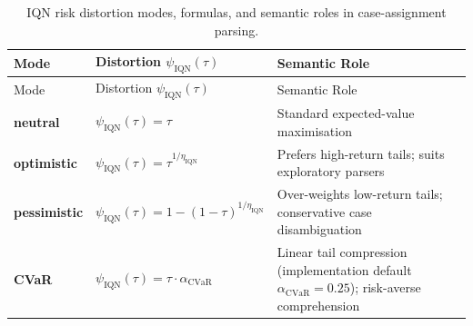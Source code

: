 \documentclass[
]{article}
\begin{document}
\begin{longtable}[]{@{}
  >{\raggedright\arraybackslash}p{}
  >{\raggedright\arraybackslash}p{}
  >{\raggedright\arraybackslash}p{}@{}}
\caption{IQN risk distortion modes, formulas, and semantic roles in
case-assignment parsing.}\label{tbl:iqn-modes}\tabularnewline
\toprule\noalign{}
\begin{minipage}[b]{\linewidth}\raggedright
Mode
\end{minipage} & \begin{minipage}[b]{\linewidth}\raggedright
Distortion \(\psi_{\mathrm{IQN}}(\tau)\)
\end{minipage} & \begin{minipage}[b]{\linewidth}\raggedright
Semantic Role
\end{minipage} \\
\midrule\noalign{}
\endfirsthead
\toprule\noalign{}
\begin{minipage}[b]{\linewidth}\raggedright
Mode
\end{minipage} & \begin{minipage}[b]{\linewidth}\raggedright
Distortion \(\psi_{\mathrm{IQN}}(\tau)\)
\end{minipage} & \begin{minipage}[b]{\linewidth}\raggedright
Semantic Role
\end{minipage} \\
\midrule\noalign{}
\endhead
\bottomrule\noalign{}
\endlastfoot
\textbf{neutral} & \(\psi_{\mathrm{IQN}}(\tau) = \tau{}\) & Standard
expected-value maximisation \\
\textbf{optimistic} &
\(\psi_{\mathrm{IQN}}(\tau) = \tau^{1/\eta_{\mathrm{IQN}}}\) & Prefers
high-return tails; suits exploratory parsers \\
\textbf{pessimistic} &
\(\psi_{\mathrm{IQN}}(\tau) = 1 - (1-\tau)^{1/\eta_{\mathrm{IQN}}}\) &
Over-weights low-return tails; conservative case disambiguation \\
\textbf{CVaR} &
\(\psi_{\mathrm{IQN}}(\tau) = \tau \cdot \alpha_{\mathrm{CVaR}}\) &
Linear tail compression (implementation default
\(\alpha_{\mathrm{CVaR}} = 0.25\)); risk-averse comprehension \\
\end{longtable}
\end{document}
